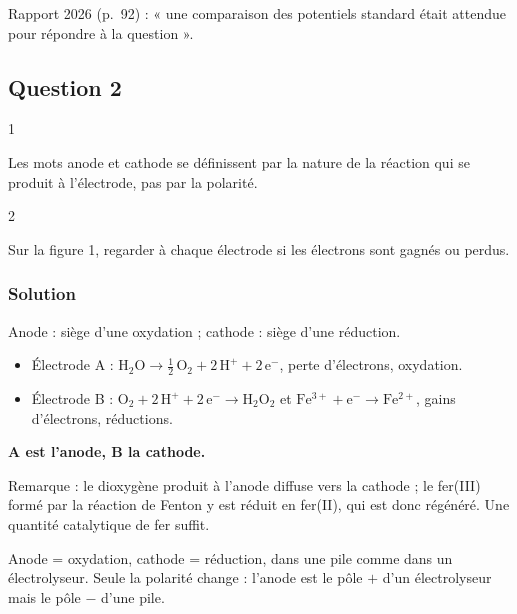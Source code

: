 \documentclass[11pt,a4paper]{article}
\providecommand{\tightlist}{\setlength{\itemsep}{0pt}\setlength{\parskip}{0pt}}
\begin{document}
\begin{jury}

Rapport 2026 (p.~92) : « une comparaison des potentiels standard était attendue pour répondre à la question ».

\end{jury}

\hypertarget{question-2}{%
\subsection{Question 2}\label{question-2}}

\begin{indication}{1}

Les mots anode et cathode se définissent par la nature de la réaction qui se produit à l'électrode, pas par la polarité.

\end{indication}

\begin{indication}{2}

Sur la figure 1, regarder à chaque électrode si les électrons sont gagnés ou perdus.

\end{indication}

\hypertarget{solution-1}{%
\subsubsection{Solution}\label{solution-1}}

Anode : siège d'une oxydation ; cathode : siège d'une réduction.

\begin{itemize}
\tightlist
\item
  Électrode A : \(\mathrm{H_2O} \to \mathrm{\tfrac12\,O_2} + \mathrm{2\,H^+} + \mathrm{2\,e^-}\), perte d'électrons, oxydation.
\item
  Électrode B : \(\mathrm{O_2} + \mathrm{2\,H^+} + \mathrm{2\,e^-} \to \mathrm{H_2O_2}\) et \(\mathrm{Fe^{3+}} + \mathrm{e^-} \to \mathrm{Fe^{2+}}\), gains d'électrons, réductions.
\end{itemize}

\textbf{A est l'anode, B la cathode.}

Remarque : le dioxygène produit à l'anode diffuse vers la cathode ; le fer(III) formé par la réaction de Fenton y est réduit en fer(II), qui est donc régénéré. Une quantité catalytique de fer suffit.

\begin{methode}

Anode = oxydation, cathode = réduction, dans une pile comme dans un électrolyseur. Seule la polarité change : l'anode est le pôle \(+\) d'un électrolyseur mais le pôle \(-\) d'une pile.

\end{methode}
\end{document}

